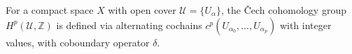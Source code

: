 
For a compact space $X$ with open cover $\mathcal{U} = \{U_\alpha\}$, the Čech cohomology group $H^p(\mathcal{U}, \mathbb{Z})$ is defined via alternating cochains $c^p(U_{\alpha_0}, \ldots, U_{\alpha_p})$ with integer values, with coboundary operator $\delta$.
